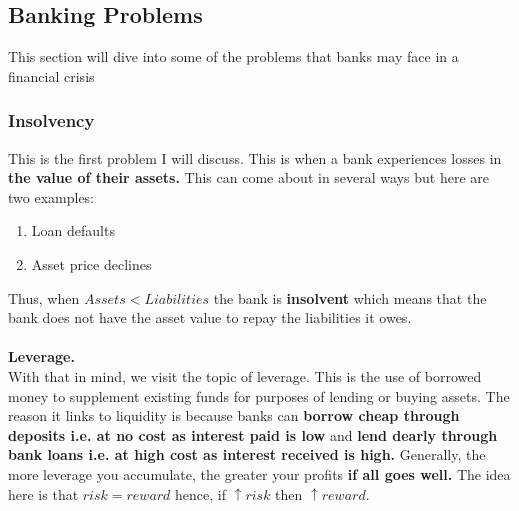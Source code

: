 \documentclass[12pt, letterpaper]{article}
\begin{document}
\subsection{Banking Problems}
This section will dive into some of the problems that banks may face in a financial crisis
\subsubsection{Insolvency}
This is the first problem I will discuss. This is when a bank experiences losses in \textbf{the value of their assets.} This can come about in several ways but here are two examples:
\begin{enumerate}
	\item Loan defaults
	\item Asset price declines
\end{enumerate}
Thus, when $Assets < Liabilities$ the bank is \textbf{insolvent} which means that the bank does not have the asset value to repay the liabilities it owes.\\\\
\textbf{Leverage.}\\
With that in mind, we visit the topic of leverage. This is the use of borrowed money to supplement existing funds for purposes of lending or buying assets. The reason it links to liquidity is because banks can \textbf{borrow cheap through deposits i.e. at no cost as interest paid is low} and \textbf{lend dearly through bank loans i.e. at high cost as interest received is high.} Generally, the more leverage you accumulate, the greater your profits \textbf{if all goes well.} The idea here is that $risk = reward$ hence, if $\uparrow risk$ then $\uparrow reward$.
\end{document}
